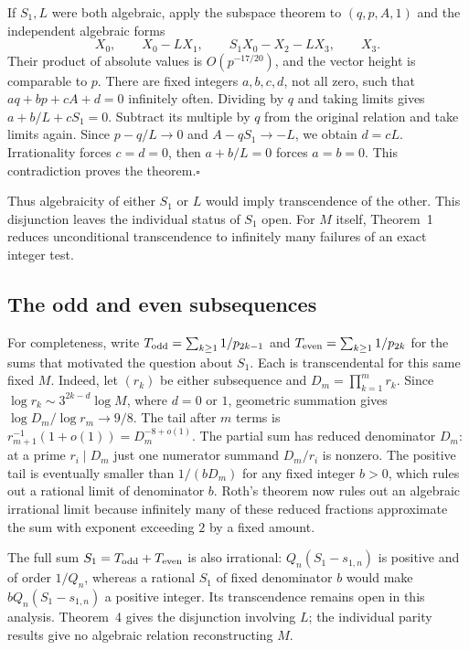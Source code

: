 \documentclass[11pt,a4paper,oneside,openany]{book}
\begin{document}
If $S_1,L$ were both algebraic, apply the subspace theorem to $(q,p,A,1)$ and the independent algebraic forms
\[
 X_0,\qquad X_0-LX_1,\qquad S_1X_0-X_2-LX_3,\qquad X_3 .
\]
Their product of absolute values is $O(p^{-17/20})$, and the vector height is comparable to $p$. There are fixed integers $a,b,c,d$, not all zero, such that $aq+bp+cA+d=0$ infinitely often. Dividing by $q$ and taking limits gives $a+b/L+cS_1=0$. Subtract its multiple by $q$ from the original relation and take limits again. Since $p-q/L\to0$ and $A-qS_1\to-L$, we obtain $d=cL$. Irrationality forces $c=d=0$, then $a+b/L=0$ forces $a=b=0$. This contradiction proves the theorem.\hfill$\square$

Thus algebraicity of either $S_1$ or $L$ would imply transcendence of the other. This disjunction leaves the individual status of $S_1$ open. For $M$ itself, Theorem~1 reduces unconditional transcendence to infinitely many failures of an exact integer test.

\subsection*{The odd and even subsequences}
For completeness, write $T_{\rm odd}=\sum_{k\ge1}1/p_{2k-1}$ and $T_{\rm even}=\sum_{k\ge1}1/p_{2k}$ for the sums that motivated the question about $S_1$. Each is transcendental for this same fixed $M$. Indeed, let $(r_k)$ be either subsequence and $D_m=\prod_{k=1}^m r_k$. Since $\log r_k\sim 3^{2k-d}\log M$, where $d=0$ or $1$, geometric summation gives $\log D_m/\log r_m\to9/8$. The tail after $m$ terms is $r_{m+1}^{-1}(1+o(1))=D_m^{-8+o(1)}$. The partial sum has reduced denominator $D_m$: at a prime $r_i\mid D_m$ just one numerator summand $D_m/r_i$ is nonzero. The positive tail is eventually smaller than $1/(bD_m)$ for any fixed integer $b>0$, which rules out a rational limit of denominator $b$. Roth's theorem now rules out an algebraic irrational limit because infinitely many of these reduced fractions approximate the sum with exponent exceeding $2$ by a fixed amount.
  
The full sum $S_1=T_{\rm odd}+T_{\rm even}$ is also irrational: $Q_n(S_1-s_{1,n})$ is positive and of order $1/Q_n$, whereas a rational $S_1$ of fixed denominator $b$ would make $bQ_n(S_1-s_{1,n})$ a positive integer. Its transcendence remains open in this analysis. Theorem~4 gives the disjunction involving $L$; the individual parity results give no algebraic relation reconstructing $M$.
\end{document}
